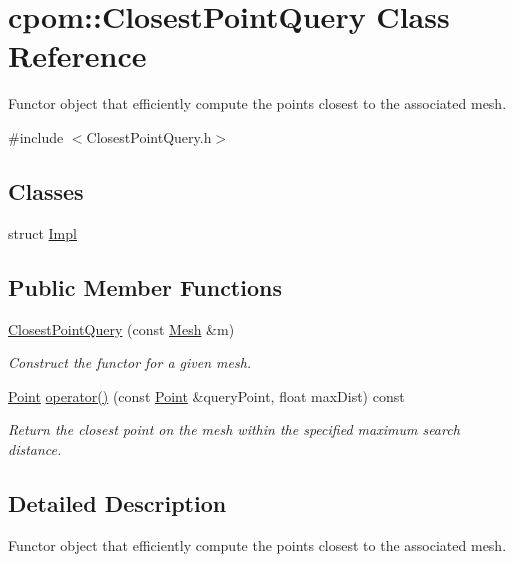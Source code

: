 \hypertarget{classcpom_1_1_closest_point_query}{}\section{cpom\+:\+:Closest\+Point\+Query Class Reference}
\label{classcpom_1_1_closest_point_query}


Functor object that efficiently compute the points closest to the associated mesh.  




{\ttfamily \#include $<$Closest\+Point\+Query.\+h$>$}

\subsection*{Classes}
\begin{DoxyCompactItemize}
\item 
struct \hyperlink{structcpom_1_1_closest_point_query_1_1_impl}{Impl}
\end{DoxyCompactItemize}
\subsection*{Public Member Functions}
\begin{DoxyCompactItemize}
\item 
\hyperlink{classcpom_1_1_closest_point_query_ae001e975e845aea88228e33baec51ad9}{Closest\+Point\+Query} (const \hyperlink{classcpom_1_1_mesh}{Mesh} \&m)
\begin{DoxyCompactList}\small\item\em Construct the functor for a given mesh. \end{DoxyCompactList}\item 
\hyperlink{structcpom_1_1_float3}{Point} \hyperlink{classcpom_1_1_closest_point_query_a3e5c47f7c9161f3a8448800bb7ad5e2c}{operator()} (const \hyperlink{structcpom_1_1_float3}{Point} \&query\+Point, float max\+Dist) const 
\begin{DoxyCompactList}\small\item\em Return the closest point on the mesh within the specified maximum search distance. \end{DoxyCompactList}\end{DoxyCompactItemize}


\subsection{Detailed Description}
Functor object that efficiently compute the points closest to the associated mesh. 

